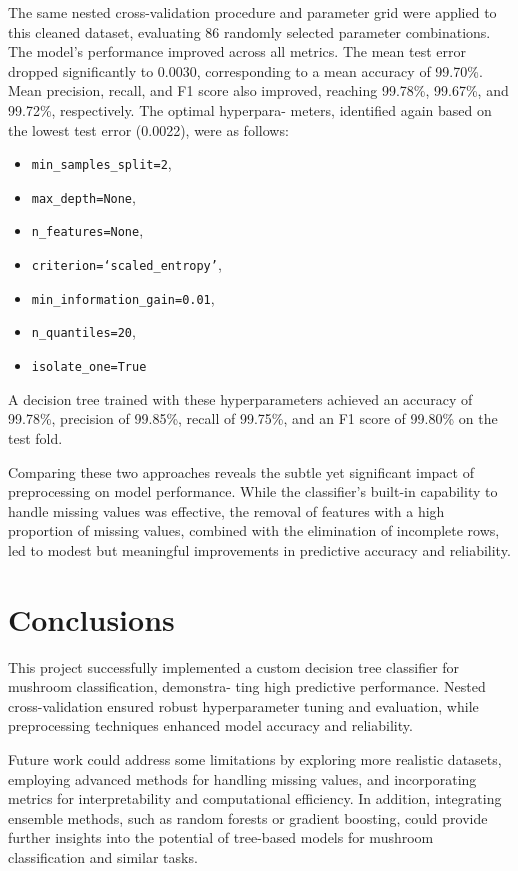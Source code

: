 \documentclass{article}
\begin{document}
The same nested cross-validation procedure and parameter grid were applied to this cleaned dataset, evaluating 86 randomly selected parameter combinations. The model's performance improved across all metrics. The mean test error dropped significantly to 0.0030, corresponding to a mean accuracy of 99.70\%. Mean precision, recall, and F1 score also improved, reaching 99.78\%, 99.67\%, and 99.72\%, respectively. The optimal hyperpara- meters, identified again based on the lowest test error (0.0022), were as follows:
\begin{itemize}
\item \texttt{min\_samples\_split=2},
\item \texttt{max\_depth=None},
\item \texttt{n\_features=None},
\item \texttt{criterion=`scaled\_entropy'},
\item \texttt{min\_information\_gain=0.01},
\item \texttt{n\_quantiles=20},
\item \texttt{isolate\_one=True}
\end{itemize}

\noindent A decision tree trained with these hyperparameters achieved an accuracy of 99.78\%, precision of 99.85\%, recall of 99.75\%, and an F1 score of 99.80\% on the test fold.

Comparing these two approaches reveals the subtle yet significant impact of preprocessing on model performance. While the classifier's built-in capability to handle missing values was effective, the removal of features with a high proportion of missing values, combined with the elimination of incomplete rows, led to modest but meaningful improvements in predictive accuracy and reliability.

\section{Conclusions}

This project successfully implemented a custom decision tree classifier for mushroom classification, demonstra- ting high predictive performance. Nested cross-validation ensured robust hyperparameter tuning and evaluation, while preprocessing techniques enhanced model accuracy and reliability.

Future work could address some limitations by exploring more realistic datasets, employing advanced methods for handling missing values, and incorporating metrics for interpretability and computational efficiency. In addition, integrating ensemble methods, such as random forests or gradient boosting, could provide further insights into the potential of tree-based models for mushroom classification and similar tasks.
  
\end{document}

